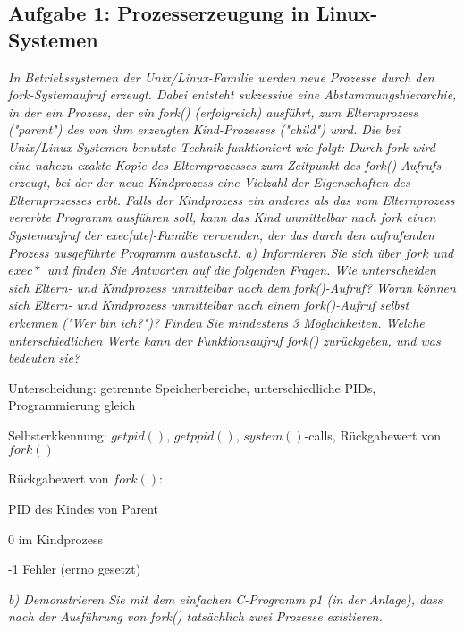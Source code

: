 \documentclass[a4paper]{article}
\begin{document}
\subsection{Aufgabe 1: Prozesserzeugung in Linux-Systemen}
\textit{In Betriebssystemen der Unix/Linux-Familie werden neue Prozesse durch den fork-Systemaufruf erzeugt. Dabei entsteht sukzessive eine Abstammungshierarchie, in der ein Prozess, der ein fork() (erfolgreich) ausführt, zum Elternprozess ("parent") des von ihm erzeugten Kind-Prozesses ("child") wird. Die bei Unix/Linux-Systemen benutzte Technik funktioniert wie folgt: Durch fork wird eine nahezu exakte Kopie des Elternprozesses zum Zeitpunkt des fork()-Aufrufs erzeugt, bei der der neue Kindprozess eine Vielzahl der Eigenschaften des Elternprozesses erbt. Falls der Kindprozess ein anderes als das vom Elternprozess vererbte Programm ausführen soll, kann das Kind unmittelbar nach fork einen Systemaufruf der exec[ute]-Familie verwenden, der das durch den aufrufenden Prozess ausgeführte Programm austauscht.}
\vspace{10mm}
\textit{a) Informieren Sie sich über $fork$ und $exec*$ und finden Sie Antworten auf die folgenden Fragen. Wie unterscheiden sich Eltern- und Kindprozess unmittelbar nach dem fork()-Aufruf? Woran können sich Eltern- und Kindprozess unmittelbar nach einem fork()-Aufruf selbst erkennen ("Wer bin ich?")? Finden Sie mindestens 3 Möglichkeiten. Welche unterschiedlichen Werte kann der Funktionsaufruf fork() zurückgeben, und was bedeuten sie?}
\vspace{10mm}
\begin{itemize*}
    \item Unterscheidung: getrennte Speicherbereiche, unterschiedliche PIDs, Programmierung gleich
    \item Selbsterkkennung: $getpid()$, $getppid()$, $system()$-calls, Rückgabewert von $fork()$
    \item Rückgabewert von $fork()$: 
    \begin{itemize*}
        \item PID des Kindes von Parent
        \item 0 im Kindprozess
        \item -1 Fehler (errno gesetzt)
    \end{itemize*}
\end{itemize*}

\textit{b) Demonstrieren Sie mit dem einfachen C-Programm p1 (in der Anlage), dass nach der Ausführung von fork() tatsächlich zwei Prozesse existieren.}
\vspace{10mm}
\end{document}
